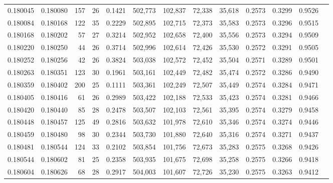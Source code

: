 \begin{tabular}{rrrrrrrrrrrrr}
0.180045 & 0.180080 &   157 &  26 &                                     0.1421 & 502,773 & 102,837 &  72,338 &  35,618 & 0.2573 & 0.3299 & 0.9526 \\
0.180084 & 0.180168 &   122 &  35 &                                     0.2229 & 502,895 & 102,715 &  72,373 &  35,583 & 0.2573 & 0.3296 & 0.9515 \\
0.180168 & 0.180202 &    57 &  27 &                                     0.3214 & 502,952 & 102,658 &  72,400 &  35,556 & 0.2573 & 0.3294 & 0.9509 \\
0.180220 & 0.180250 &    44 &  26 &                                     0.3714 & 502,996 & 102,614 &  72,426 &  35,530 & 0.2572 & 0.3291 & 0.9505 \\
0.180252 & 0.180256 &    42 &  26 &                                     0.3824 & 503,038 & 102,572 &  72,452 &  35,504 & 0.2571 & 0.3289 & 0.9501 \\
0.180263 & 0.180351 &   123 &  30 &                                     0.1961 & 503,161 & 102,449 &  72,482 &  35,474 & 0.2572 & 0.3286 & 0.9490 \\
0.180359 & 0.180402 &   200 &  25 &                                     0.1111 & 503,361 & 102,249 &  72,507 &  35,449 & 0.2574 & 0.3284 & 0.9471 \\
0.180405 & 0.180416 &    61 &  26 &                                     0.2989 & 503,422 & 102,188 &  72,533 &  35,423 & 0.2574 & 0.3281 & 0.9466 \\
0.180420 & 0.180440 &    85 &  28 &                                     0.2478 & 503,507 & 102,103 &  72,561 &  35,395 & 0.2574 & 0.3279 & 0.9458 \\
0.180448 & 0.180457 &   125 &  49 &                                     0.2816 & 503,632 & 101,978 &  72,610 &  35,346 & 0.2574 & 0.3274 & 0.9446 \\
0.180459 & 0.180480 &    98 &  30 &                                     0.2344 & 503,730 & 101,880 &  72,640 &  35,316 & 0.2574 & 0.3271 & 0.9437 \\
0.180481 & 0.180544 &   124 &  33 &                                     0.2102 & 503,854 & 101,756 &  72,673 &  35,283 & 0.2575 & 0.3268 & 0.9426 \\
0.180544 & 0.180602 &    81 &  25 &                                     0.2358 & 503,935 & 101,675 &  72,698 &  35,258 & 0.2575 & 0.3266 & 0.9418 \\
0.180604 & 0.180626 &    68 &  28 &                                     0.2917 & 504,003 & 101,607 &  72,726 &  35,230 & 0.2575 & 0.3263 & 0.9412 \\

\end{tabular}
